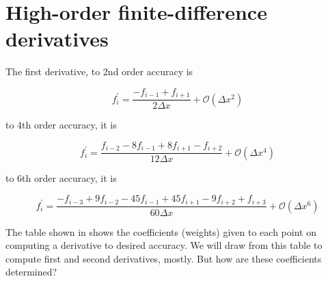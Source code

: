 \section{High-order finite-difference derivatives}

The first derivative, to 2nd order accuracy is 

\begin{equation}
f_i^\prime = \frac{-f_{i-1} + f_{i+1}}{2\Delta x} + \mathcal{O}(\Delta x^2)
\end{equation}

to 4th order accuracy, it is 

\begin{equation}
f_i^\prime = \frac{f_{i-2} -8f_{i-1} +8f_{i+1} - f_{i+2}}{12\Delta x} + \mathcal{O}(\Delta x^4)
\end{equation}

to 6th order accuracy, it is 

\begin{equation}
f_i^\prime = \frac{-f_{i-3} + 9f_{i-2} -45f_{i-1} +45f_{i+1} -9f_{i+2} + f_{i+3}}{60\Delta x} + \mathcal{O}(\Delta x^6)
\end{equation}

The table shown in  shows the coefficients (weights) given to each point on computing a derivative to desired accuracy. We will draw from this table to compute first and second derivatives, mostly. But how are these coefficients determined?  

\begin{figure}
  \begin{center}
  \end{center}
  \caption[]{}
  \label{fig:tablecoefficients}
\end{figure}

